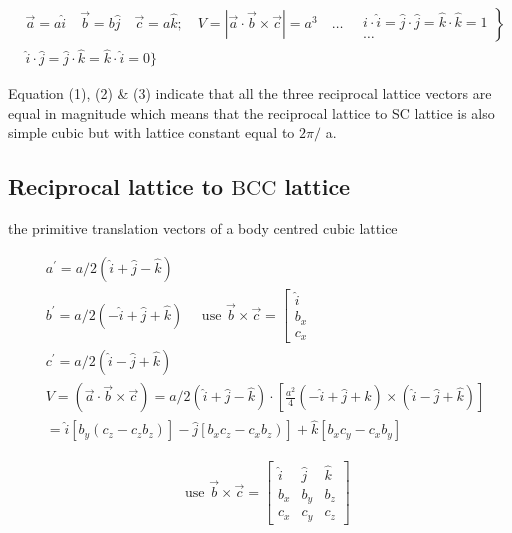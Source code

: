 $$
\begin{aligned}
& \left.\vec{a}=a \hat{i} \quad \vec{b}=b \hat{j} \quad \vec{c}=a \hat{k} ; \quad V=|\vec{a} \cdot \vec{b} \times \vec{c}|=a^{3} \quad \ldots \quad \begin{array}{l}i \cdot \hat{i}=\hat{j} \cdot \hat{j}=\hat{k} \cdot \hat{k}=1 \\\ldots\end{array}\right\} \\
& \hat{i} \cdot \hat{j}=\hat{j} \cdot \hat{k}=\hat{k} \cdot \hat{i}=0\} 
\end{aligned}
$$



Equation (1), (2) \& (3) indicate that all the three reciprocal lattice vectors are equal in magnitude which means that the reciprocal lattice to SC lattice is also simple cubic but with lattice constant equal to $2 \pi /$ a.

\subsection{Reciprocal lattice to $\mathrm{BCC}$ lattice}

the primitive translation vectors of a body centred cubic lattice

$$
\begin{aligned}
&a^{\prime}=a / 2(\hat{i}+\hat{j}-\hat{k}) \\
&b^{\prime}=a / 2(-\hat{i}+\hat{j}+\hat{k}) \quad \text { use } \vec{b} \times \vec{c}=\left[\begin{array}{l}
\hat{i} \\
b_{x} \\
c_{x}
\end{array}\right. \\
&c^{\prime}=a / 2(\hat{i}-\hat{j}+\hat{k}) \\
&V=(\vec{a} \cdot \vec{b} \times \vec{c})=a / 2(\hat{i}+\hat{j}-\hat{k}) \cdot\left[\frac{a^{2}}{4}(-\hat{i}+\hat{j}+\hat{k}) \times(\hat{i}-\hat{j}+\hat{k})\right] \\
&\left.=\hat{i}\left[b_{y}\left(c_{z}-c_{z} b_{z}\right)\right]-\hat{j}\left[b_{x} c_{z}-c_{x} b_{z}\right)\right]+\hat{k}\left[b_{x} c_{y}-c_{x} b_{y}\right]
\end{aligned}
$$

$$
\begin{aligned}
& \text { use } \vec{b} \times \vec{c}=\left[\begin{array}{lll}\hat{i} & \hat{j} & \hat{k} \\b_{x} & b_{y} & b_{z} \\c_{x} & c_{y} & c_{z}\end{array}\right]
\end{aligned}
$$

